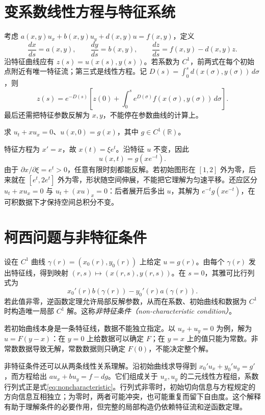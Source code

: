 \section{变系数线性方程与特征系统}
考虑 $a(x,y)u_x+b(x,y)u_y+d(x,y)u=f(x,y)$，定义
\[
 \frac{dx}{ds}=a(x,y),\qquad \frac{dy}{ds}=b(x,y),\qquad
 \frac{dz}{ds}=f(x,y)-d(x,y)z.
\]
沿特征曲线应有 $z(s)=u(x(s),y(s))$。若系数为 $C^1$，前两式在每个初始点附近有唯一特征流；第三式是线性方程。记 $D(s)=\int_0^s d(x(\sigma),y(\sigma))\,d\sigma$，则
\[
 z(s)=e^{-D(s)}\left[z(0)+\int_0^s e^{D(\sigma)}f(x(\sigma),y(\sigma))\,d\sigma\right].
\]
最后还需把特征参数反解为 $x,y$，不能停在参数曲线的计算上。

\begin{example}[变化的输运速度]
求 $u_t+xu_x=0$、$u(x,0)=g(x)$，其中 $g\in C^1(\mathbb R)$。
\end{example}
\begin{solve}
特征方程为 $x'=x$，故 $x(t)=\xi e^t$。沿特征 $u$ 不变，因此
\[
 u(x,t)=g(xe^{-t}).
\]
由于 $\partial x/\partial\xi=e^t>0$，任意有限时刻都能反解。若初始图形在 $[1,2]$ 外为零，后来就在 $[e^t,2e^t]$ 外为零，形状随空间伸展，不能把它理解为匀速平移。还应区分 $u_t+xu_x=0$ 与 $u_t+(xu)_x=0$：后者展开后多出 $u$，其解为 $e^{-t}g(xe^{-t})$，在可积数据下才保持空间总积分不变。
\end{solve}

\section{柯西问题与非特征条件}
设在 $C^1$ 曲线 $\gamma(r)=(x_0(r),y_0(r))$ 上给定 $u=g(r)$。由每个 $\gamma(r)$ 发出特征线，得到映射 $(r,s)\mapsto(x(r,s),y(r,s))$。在 $s=0$，其雅可比行列式为
\begin{equation}
 x_0'(r)b(\gamma(r))-y_0'(r)a(\gamma(r)).
 \label{eq:noncharacteristic}
\end{equation}
若此值非零，逆函数定理允许局部反解参数，从而在系数、初始曲线和数据为 $C^1$ 时构造唯一局部 $C^1$ 解。这称\emph{非特征条件（non-characteristic condition）}。

若初始曲线本身是一条特征线，数据不能独立指定。以 $u_x+u_y=0$ 为例，解为 $u=F(y-x)$：在 $y=0$ 上给数据可以确定 $F$；在 $y=x$ 上的值只能为常数。非常数数据导致无解，常数数据则只确定 $F(0)$，不能决定整个解。

非特征条件还可以从两条线性关系理解。沿初始曲线求导得到 $x_0'u_x+y_0'u_y=g'$，而方程给出 $au_x+bu_y=f-dg$。它们组成关于 $u_x,u_y$ 的二元线性方程组，系数行列式正是式\eqref{eq:noncharacteristic}。行列式非零时，初始切向信息与方程规定的方向信息互相独立；为零时，两者可能冲突，也可能重复而留下自由度。这个解释有助于理解条件的必要作用，但完整的局部构造仍依赖特征流和逆函数定理。

